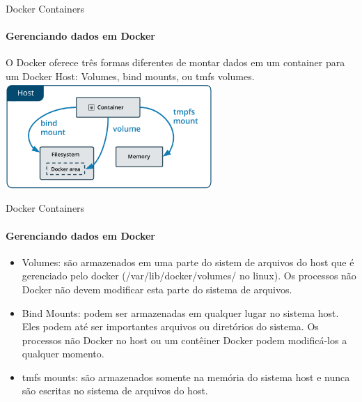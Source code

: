 \documentclass{beamer}
\begin{document}
\begin{frame}{Docker Containers}
    \framesubtitle{Gerenciando dados em Docker}
    O Docker oferece tr\^es formas diferentes de montar dados em um container para um Docker Host: Volumes,
    bind mounts, ou tmfs volumes.
        \includegraphics[height=4cm]{img/types-of-mounts.png}
\end{frame}

\begin{frame}{Docker Containers}
    \framesubtitle{Gerenciando dados em Docker}
    \begin{itemize}
        \item Volumes: s\~ao armazenados em uma parte do sistem de arquivos do host que \'e gerenciado pelo docker (/var/lib/docker/volumes/ no linux).
            Os processos n\~ao Docker n\~ao devem modificar esta parte do sistema de arquivos.
        \item Bind Mounts: podem ser armazenadas em qualquer lugar no sistema host. Eles podem at\'e ser importantes arquivos ou diret\'orios do sistema.
            Os processos n\~ao Docker no host ou um cont\^einer Docker podem modific\'a-los a qualquer momento.
        \item tmfs mounts: s\~ao armazenados somente na mem\'oria do sistema host e nunca s\~ao escritas no sistema de arquivos do host.
    \end{itemize}
\end{frame}
\end{document}
